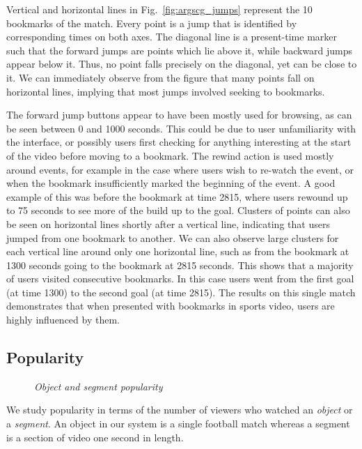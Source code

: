 \documentclass[letterpaper,nocopyrightspace]{sig-alternate}
\newcommand{\capttext}{\protect\centering\em}
\begin{document}
Vertical and horizontal lines in Fig.~\ref{fig:argscg_jumps}
represent the 10 bookmarks of the match. Every point is a jump that
is identified by corresponding times on both axes.  The diagonal
line is a present-time marker such that the forward jumps are points
which lie above it, while backward jumps appear below it. Thus, no
point falls precisely on the diagonal, yet can be close to it. We
can immediately observe from the figure that many points fall on
horizontal lines, implying that most jumps involved seeking to
bookmarks.

The forward jump buttons appear to have been mostly used for
browsing, as can be seen between 0 and 1000 seconds. This could be
due to user unfamiliarity with the interface, or possibly users
first checking for anything interesting at the start of the video
before moving to a bookmark. The rewind action is used mostly around
events, for example in the case where users wish to re-watch the
event, or when the bookmark insufficiently marked the beginning of
the event. A good example of this was before the bookmark at time
2815, where users rewound up to 75 seconds to see more of the build
up to the goal. Clusters of points can also be seen on horizontal
lines shortly after a vertical line, indicating that users jumped
from one bookmark to another.  We can also observe large clusters
for each vertical line around only one horizontal line, such as from
the bookmark at 1300 seconds going to the bookmark at 2815 seconds.
This shows that a majority of users visited consecutive bookmarks.
In this case users went from the first goal (at time 1300) to the
second goal (at time 2815). The results on this single match
demonstrates that when presented with bookmarks in sports video,
users are highly influenced by them.

\subsection{Popularity}
\begin{figure}[tb]
\centering {} \caption{\capttext Object and segment
popularity} \label{fig:popularity_object_rank}
\end{figure}

We study popularity in terms of the number of viewers who watched an
\emph{object} or a \emph{segment}. An object in our system is a
single football match whereas a segment is a section of video one
second in length.
\end{document}
